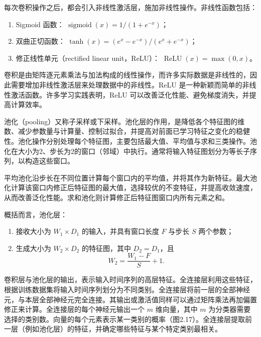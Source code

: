 
\FloatBarrier


每次卷积操作之后，都会引入非线性激活层，施加非线性操作。非线性函数包括：
\begin{enumerate}
\item Sigmoid 函数：
$\operatorname{sigmoid}(x)=1/(1+e^{-x})$；
\item 双曲正切函数：
$\tanh(x)=(e^x-e^{-x})/(e^x+e^{-x})$；
\item 修正线性单元（rectified linear unit，ReLU）：
$\operatorname{ReLU}(x)=\max(0,x)$。
\end{enumerate}
卷积是由矩阵逐元素乘法与加法构成的线性操作，而许多实际数据是非线性的，因此需要增加非线性激活层来处理数据中的非线性。ReLU 是一种新颖而简单的非线性激活函数。许多学习实践表明，ReLU 可以改善泛化性能、避免梯度消失，并提高计算效率。


池化（pooling）又称子采样或下采样。池化层的作用，是降低各个特征图的维数、减少参数量与计算量、控制过拟合，并提高对前面已学习特征之变化的稳健性。池化操作分别处理每个特征图，主要包括最大值、平均值与求和三类操作。池化在大小为2、步长为2的窗口（邻域）中执行。通常将输入特征图划分为等长子序列，以构造这些窗口。

平均池化沿步长在不同位置计算每个窗口内的平均值，并将其作为新特征。最大池化计算该窗口内修正后特征图的最大值，选择较优的不变特征，并提高收敛速度，从而改善泛化性能。求和池化则计算修正后特征图窗口内所有元素之和。

概括而言，池化层：
\begin{enumerate}
\item 接收大小为 $W_1\times D_1$ 的输入，并具有窗口长度 $F$ 与步长 $S$ 两个参数；
\item 生成大小为 $W_2\times D_2$ 的特征图，其中 $D_2=D_1$，且
\[
W_2=\frac{W_1-F}{S}+1.
\]
\end{enumerate}


卷积层与池化层的输出，表示输入时间序列的高层特征。全连接层利用这些特征，根据训练数据集将输入时间序列划分为不同类别。全连接层将前一层的全部神经元，与本层全部神经元完全连接。其输出或激活值同样可以通过矩阵乘法再加偏置修正来计算。全连接层的每个神经元输出一个 $m$ 维向量，其中 $m$ 为分类器需要选择的类别数。向量的每个元素表示某一类别的概率（图2.17）。全连接层提取前一层（例如池化层）的特征，并确定哪些特征与某个特定类别最相关。

